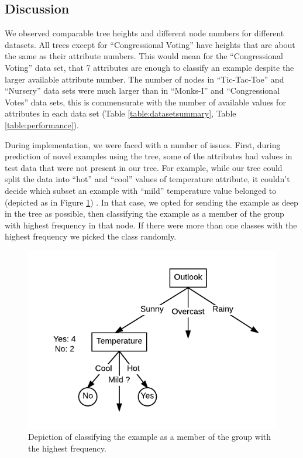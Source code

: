 \documentclass[12pt]{article}
\begin{document}
\subsection{Discussion}\label{discussion}
We observed comparable tree heights and different node numbers for
different datasets. All trees except for ``Congressional Voting'' have
heights that are about the same as their attribute numbers. This would
mean for the ``Congressional Voting'' data set, that 7 attributes are
enough to classify an example despite the larger available attribute
number. The number of nodes in ``Tic-Tac-Toe'' and ``Nursery'' data sets
were much larger than in ``Monks-I'' and ``Congressional Votes'' data sets,
this is commensurate with the number of available values for
attributes in each data set (Table \ref{table:datasetsummary}, Table \ref{table:performance}).

During implementation, we were faced with a number of issues. First,
during prediction of novel examples using the tree, some of the
attributes had values in test data that were not present in our
tree. For example, while our tree could split the data into ``hot''
and ``cool'' values of temperature attribute, it couldn't decide which
subset an example with ``mild'' temperature value belonged to
(depicted as in Figure \ref{fig:majority-vote}) . In that case, we
opted for sending the example as deep in the tree as possible, then
classifying the example as a member of the group with highest
frequency in that node. If there were more than one classes with the
highest frequency we picked the class randomly.

\begin{figure}[H]
  \centering
  \includegraphics[scale=0.5]{img/majority_voting}
  \caption{Depiction of classifying the example as a member of the group with the highest frequency.}
  \label{fig:majority-vote}
\end{figure}
\end{document}
